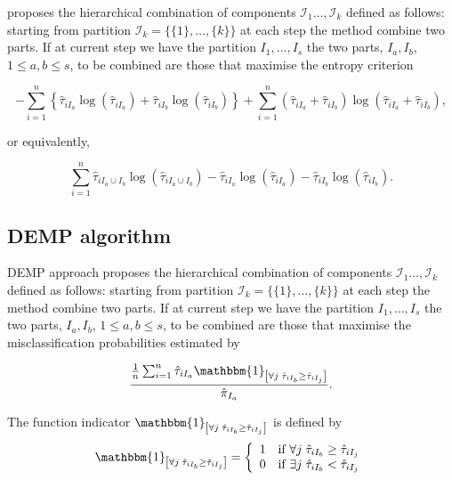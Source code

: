 \documentclass[10pt, a4paper]{article}
\begin{document}
\cite{baudry2010combining} proposes the  hierarchical combination of components  $\mathcal{I}_1 \dots, \mathcal{I}_k$ defined as follows: starting from partition $\mathcal{I}_k = \{\{1\},\dots, \{k\}\}$ at each step the method combine two parts. If at current step we have the partition  $I_1, \dots, I_s$ the two parts, $I_a, I_b$, $1 \leq a,b \leq s$, to be combined are those that maximise the entropy criterion

\[
- \sum_{i=1}^n \left\{ \hat{\tau}_{iI_a} \log(\hat{\tau}_{iI_a}) + \hat{\tau}_{iI_b} \log(\hat{\tau}_{iI_b})\right\} +  \sum_{i=1}^n  (\hat{\tau}_{iI_a}+\hat{\tau}_{iI_b}) \log(\hat{\tau}_{iI_a} + \hat{\tau}_{iI_b}),
\]

or equivalently,

\[
 \sum_{i=1}^n \hat{\tau}_{i I_a \cup I_b} \log(\hat{\tau}_{i I_a \cup I_b}) - \hat{\tau}_{iI_a} \log(\hat{\tau}_{iI_a}) - \hat{\tau}_{iI_b} \log(\hat{\tau}_{iI_b}).
\]


\subsection*{DEMP algorithm}


DEMP approach \citep{hennig2010methods} proposes the hierarchical combination of components  $\mathcal{I}_1 \dots, \mathcal{I}_k$ defined as follows: starting from partition $\mathcal{I}_k = \{\{1\},\dots, \{k\}\}$ at each step the method combine two parts. If at current step we have the partition  $I_1, \dots, I_s$ the two parts, $I_a, I_b$, $1 \leq a,b \leq s$,  to be combined are those that maximise the misclassification probabilities estimated by 

\begin{equation}\label{demp_criteria}
\frac{ \frac{1}{n} \sum_{i=1}^n {\hat{\tau}_{iI_a} \mathbbm{1}_{\left[ \forall j\; \hat{\tau}_{i I_{b}} \geq \hat{\tau}_{iI_j} \right]}}}{ \hat{\pi}_{I_a}}.
\end{equation}

The function indicator $\mathbbm{1}_{\left[ \forall j\; \hat{\tau}_{i I_{b}} \geq \hat{\tau}_{iI_j} \right]}$ is defined by
\[
\mathbbm{1}_{\left[ \forall j\; \hat{\tau}_{i I_{b}} \geq \hat{\tau}_{iI_j} \right]} =
\left\{\begin{array}{ll}	
1 & \text{if $\forall j\; \hat{\tau}_{i I_{b}} \geq \hat{\tau}_{iI_j}$}\\
0 & \text{if $\exists j\; \hat{\tau}_{i I_{b}} < \hat{\tau}_{iI_j}$}
\end{array}\right.
\]
\end{document}
